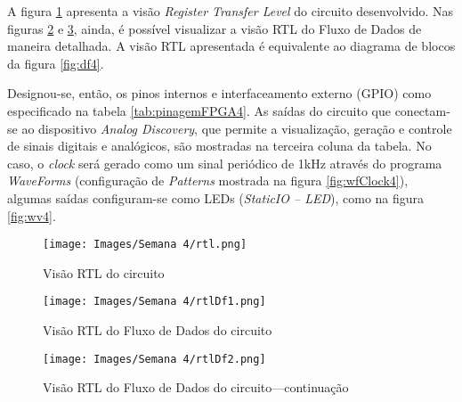 \documentclass[amsmath,amssymb,floatfix]{report}
\begin{document}
A figura \ref{fig:rtl4} apresenta a visão \textit{Register Transfer Level} do circuito desenvolvido. Nas figuras \ref{fig:rtlDf41} e \ref{fig:rtlDf42}, ainda, é possível visualizar a visão RTL do Fluxo de Dados de maneira detalhada. A visão RTL apresentada é equivalente ao diagrama de blocos da figura \ref{fig:df4}.

Designou-se, então, os pinos internos e interfaceamento externo (GPIO) como especificado na tabela \ref{tab:pinagemFPGA4}. As saídas do circuito que conectam-se ao dispositivo \textit{Analog Discovery}, que permite a visualização, geração e controle de sinais digitais e analógicos, são mostradas na terceira coluna da tabela. No caso, o \textit{clock} será gerado como um sinal periódico de 1kHz através do programa \textit{WaveForms} (configuração de \textit{Patterns} mostrada na figura \ref{fig:wfClock4}), algumas saídas configuram-se como LEDs (\textit{StaticIO -- LED}), como na figura \ref{fig:wv4}.

\begin{figure}[H]
\centering
\texttt{[image: Images/Semana 4/rtl.png]} 
    \caption{Visão RTL do circuito}
    \label{fig:rtl4}
\end{figure} 

\begin{figure}[H]
\centering
\texttt{[image: Images/Semana 4/rtlDf1.png]} 
    \caption{Visão RTL do Fluxo de Dados do circuito}
    \label{fig:rtlDf41}
\end{figure} 

\begin{figure}[H]
\centering
\texttt{[image: Images/Semana 4/rtlDf2.png]} 
    \caption{Visão RTL do Fluxo de Dados do circuito---continuação}
    \label{fig:rtlDf42}
\end{figure} 

\newpage
\end{document}
